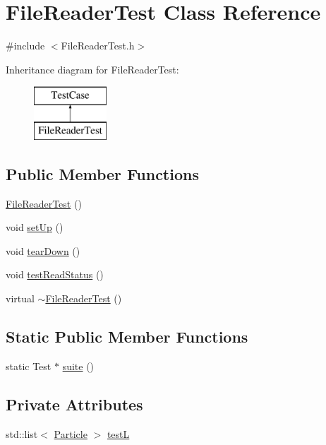 \hypertarget{classFileReaderTest}{\section{File\-Reader\-Test Class Reference}
\label{classFileReaderTest}
}


{\ttfamily \#include $<$File\-Reader\-Test.\-h$>$}

Inheritance diagram for File\-Reader\-Test\-:\begin{figure}[H]
\begin{center}
\leavevmode
\includegraphics[height=2.000000cm]{classFileReaderTest}
\end{center}
\end{figure}
\subsection*{Public Member Functions}
\begin{DoxyCompactItemize}
\item 
\hyperlink{classFileReaderTest_ac92a30377a8218554355290cb0ae130e}{File\-Reader\-Test} ()
\item 
void \hyperlink{classFileReaderTest_a8bb8664fa4d0e49718bb9ba817fa771d}{set\-Up} ()
\item 
void \hyperlink{classFileReaderTest_ada74df1e362f734c57ee89f7bf53e521}{tear\-Down} ()
\item 
void \hyperlink{classFileReaderTest_aaf0cd61b9bd03ae16b5352510de97aa6}{test\-Read\-Status} ()
\item 
virtual \hyperlink{classFileReaderTest_aeb69bbc38884c819cfd68ac750d7fdb3}{$\sim$\-File\-Reader\-Test} ()
\end{DoxyCompactItemize}
\subsection*{Static Public Member Functions}
\begin{DoxyCompactItemize}
\item 
static Test $\ast$ \hyperlink{classFileReaderTest_ab8f863433805210e5eb463c961d3c3bc}{suite} ()
\end{DoxyCompactItemize}
\subsection*{Private Attributes}
\begin{DoxyCompactItemize}
\item 
std\-::list$<$ \hyperlink{classParticle}{Particle} $>$ \hyperlink{classFileReaderTest_a9392293a0d47f08bee440ea1b4c5925a}{test\-L}
\end{DoxyCompactItemize}


